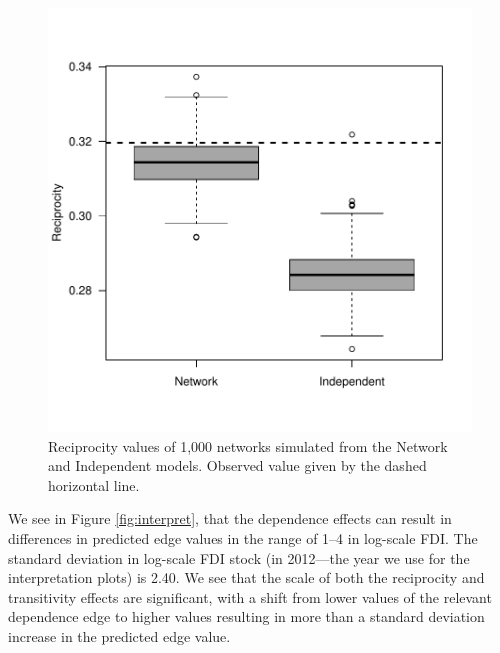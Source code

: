 \documentclass[reqno,onecolumn,letterpaper,12pt]{article}
\begin{document}
\begin{figure}[!h]
\centering
\includegraphics[scale=.75]{draft_figures/reciprocityFit.pdf} \vspace{-.5cm}
\caption{\label{fig:recipFit} Reciprocity values of 1,000 networks simulated from the Network and Independent models. Observed value given by the dashed horizontal line.}
\end{figure}

We see in Figure \ref{fig:interpret}, that the dependence effects can result in differences in predicted edge values in the range of 1--4 in log-scale FDI.  The standard deviation in log-scale FDI stock (in 2012---the year we use for the interpretation plots) is 2.40.  We see that the scale of both the reciprocity and transitivity effects are significant, with a shift from lower values of the relevant dependence edge to higher values resulting in more than a standard deviation increase in the predicted edge value.
\end{document}
